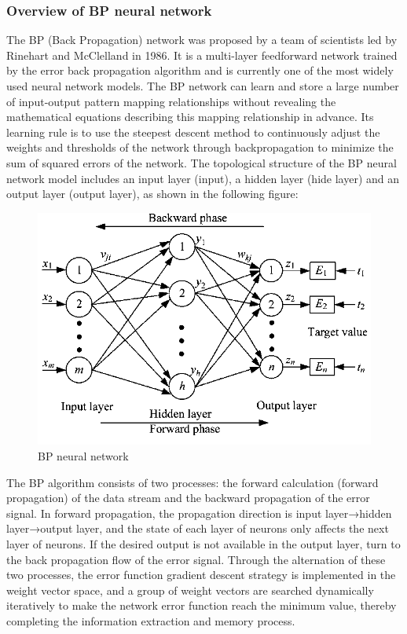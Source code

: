 \documentclass[12pt]{article}  %
\begin{document}
\subsubsection{Overview of BP neural network}
The BP (Back Propagation) network was proposed by a team of scientists led by Rinehart and McClelland in 1986. It is a multi-layer feedforward network trained by the error back propagation algorithm and is currently one of the most widely used neural network models. The BP network can learn and store a large number of input-output pattern mapping relationships without revealing the mathematical equations describing this mapping relationship in advance. Its learning rule is to use the steepest descent method to continuously adjust the weights and thresholds of the network through backpropagation to minimize the sum of squared errors of the network. The topological structure of the BP neural network model includes an input layer (input), a hidden layer (hide layer) and an output layer (output layer), as shown in the following figure:  

\begin{figure}[h!]
\centering
\includegraphics[scale=0.9]{figure1.png}
\caption{BP neural network}
\label{fig:bp1}
\end{figure}

 The BP algorithm consists of two processes: the forward calculation (forward propagation) of the data stream and the backward propagation of the error signal. In forward propagation, the propagation direction is input layer→hidden layer→output layer, and the state of each layer of neurons only affects the next layer of neurons. If the desired output is not available in the output layer, turn to the back propagation flow of the error signal. Through the alternation of these two processes, the error function gradient descent strategy is implemented in the weight vector space, and a group of weight vectors are searched dynamically iteratively to make the network error function reach the minimum value, thereby completing the information extraction and memory process.
\end{document}
